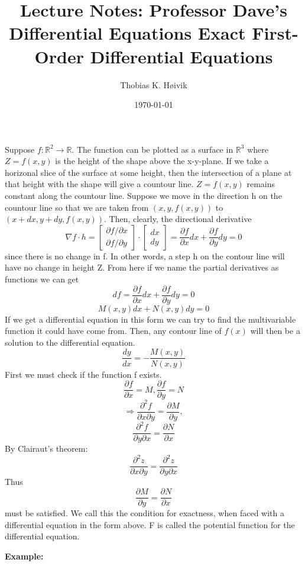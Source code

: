 \documentclass[12pt]{article}
\title{Lecture Notes: Professor Dave's Differential Equations  Exact First-Order Differential Equations}
\author{Thobias K. Høivik}
\date{\today}
\begin{document}
\maketitle
\noindent 
Suppose \(f: \mathbb R^2 \to \mathbb R\). The function 
can be plotted as a surface in \(\mathbb R^3\) 
where \(Z = f(x,y)\) is the height of the shape above the x-y-plane. 
If we take a horizonal slice of the surface at some height, then the intersection 
of a plane at that height with the shape will give a countour line.
\(Z = f(x,y)\) remains constant along the countour line. 
Suppose we move in the direction h on the countour line so that we are taken from 
\((x,y, f(x,y))\) to \((x+dx,y+dy,f(x,y))\). Then, clearly, the directional derivative 
\[ 
    \nabla f \cdot h = 
    \begin{bmatrix}
        \partial f / \partial x \\ 
        \partial f / \partial y
    \end{bmatrix}
    \cdot 
    \begin{bmatrix}
        dx \\ dy  
    \end{bmatrix}
    = 
    \frac{\partial f}{\partial x} dx + \frac{\partial f}{\partial y} dy = 0
\]
since there is no change in f. In other words, a step h on the contour line will have no change 
in height Z.
From here if we name the partial derivatives as functions we can get 
\[ 
    df = \frac{\partial f}{\partial x} dx + \frac{\partial f}{\partial y}dy = 0 
\]
\[ 
    M(x,y) dx + N(x,y) dy = 0
\]
If we get a differential equation in this form we can try to find the 
multivariable function it could have come from. Then, any contour line of \(f(x)\)
will then be a solution to the differential equation.
\[ 
    \frac{dy}{dx} = - \frac{M(x,y)}{N(x,y)}
\]
First we must check if the function f exists. 
\[ 
    \frac{\partial f}{\partial x} = M, \frac{\partial f}{\partial y} = N
\]
\[ 
    \Rightarrow \frac{\partial^2 f}{\partial x \partial y} = \frac{\partial M}{\partial y},
\]
\[
    \frac{\partial^2 f}{\partial y \partial x} = \frac{\partial N}{\partial x}
\]
By Clairaut's theorem: 
\[ 
    \frac{\partial^2 z}{\partial x \partial y} = \frac{\partial^2 z}{\partial y \partial x}
\]
Thus 
\[ 
    \frac{\partial M}{\partial y} = \frac{\partial N}{\partial x}
\]
must be satisfied. We call this the condition for exactness, when faced with a differential 
equation in the form above. F is called the potential function for the differential equation.

\noindent 
\textbf{Example: }
\end{document}
